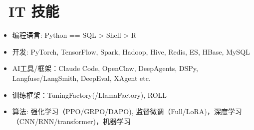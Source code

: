 \documentclass{resume}
\begin{document}

\vspace{0.3em}
\section{\faCogs\ IT 技能}
\begin{itemize}[parsep=0.5ex]
  \item 编程语言: Python == SQL > Shell > R
  \item 开发: PyTorch, TensorFlow, Spark, Hadoop, Hive, Redis, ES, HBase, MySQL
  \item AI工具/框架：Claude Code, OpenClaw, DeepAgents, DSPy, Langfuse/LangSmith, DeepEval, XAgent etc.
  \item 训练框架：TuningFactory(/LlamaFactory), ROLL
  \item 算法: 强化学习（PPO/GRPO/DAPO), 监督微调（Full/LoRA)，深度学习（CNN/RNN/transformer)，机器学习
\end{itemize}
\end{document}
